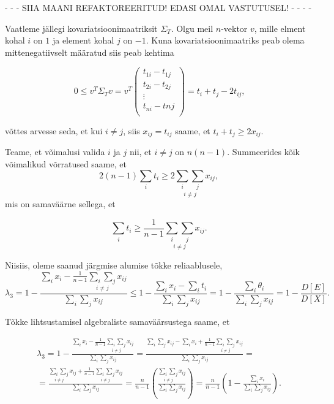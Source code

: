 \documentclass[a4paper,12pt]{article}
\numberwithin{equation}{section}
\theoremstyle{definition}
\begin{document}
 {\color{red}- - - SIIA MAANI REFAKTOREERITUD! EDASI OMAL VASTUTUSEL! - - - -} 

Vaatleme jällegi kovariatsioonimaatriksit $\Sigma_T$. Olgu meil $n$-vektor $v$, mille elment kohal $i$ on $1$ ja element kohal $j$ on $-1$. Kuna kovariatsioonimaatriks peab olema mittenegatiivselt määratud siis peab kehtima

\begin{equation*}
\label{eq:psd 1 -1 vector}
0 \leq v^T \Sigma_T v = v^T 
\begin{pmatrix}
t_{1i} - t_{1j} \\
t_{2i} - t_{2j} \\
\vdots \\
t_{ni} - t{nj} \\
\end{pmatrix}
= t_{i} + t_{j} - 2 t_{ij} \text{,}
\end{equation*}

võttes arvesse seda, et kui $i \neq j$, siis $x_{ij} = t_{ij}$ saame, et $t_i + t_j \geq 2 x_{ij}$. 

Teame, et võimalusi valida $i$ ja $j$ nii, et $i \neq j$ on $n \left( n -1 \right)$. Summeerides kõik võimalikud võrratused saame, et
\begin{equation*}
2 \left( n - 1 \right) \sum_i t_i \geq 2  \underset{i \neq j}{\sum_i \sum_j} x_{ij},
\end{equation*}
mis on samaväärne sellega, et

\begin{equation*}
\sum_i t_i \geq  \frac{1}{n - 1} \underset{i \neq j}{\sum_i \sum_j} x_{ij}.
\end{equation*}


Niisiis, oleme saanud järgmise alumise tõkke reliaablusele, 
\begin{equation*}
\lambda_3 = 1 - \frac{\sum_i x_i - \frac{1}{n-1}{\underset{i \neq j}{\sum_i \sum_j} x_{ij}}}{\sum_i \sum_j x_{ij}} \leq  1 - \frac{\sum_i x_i - \sum_i t_i}{\sum_i \sum_j x_{ij}} =   1 - \frac{\sum_i \theta_i}{\sum_i \sum_j x_{ij}} =  1 - \frac{D \left[ E \right]}{D \left[ X \right]} \text{.}
\end{equation*}

Tõkke lihtsustamisel algebraliste samaväärsustega saame, et

\begin{equation*}
\begin{gathered}
\lambda_3 = 1 - \frac{\sum_i x_i - \frac{1}{n-1}{\underset{i \neq j}{\sum_i \sum_j} x_{ij}}}{\sum_i \sum_j x_{ij}} =  \frac{\sum_i \sum_j x_{ij} -  \sum_i x_i + \frac{1}{n-1}{\underset{i \neq j}{\sum_i \sum_j} x_{ij}}  }{\sum_i \sum_j x_{ij}} = \\
= \frac{{\underset{i \neq j}{\sum_i \sum_j} x_{ij}} + \frac{1}{n-1}{\underset{i \neq j}{\sum_i \sum_j} x_{ij}}}{\sum_i \sum_j x_{ij}} = \frac{n}{n-1} \left( \frac{\underset{i \neq j}{\sum_i \sum_j} x_{ij}}{\sum_i \sum_j x_{ij}} \right) = \frac{n}{n-1} \left(1 - \frac{\sum_i x_{i}}{\sum_i \sum_j x_{ij}} \right).
\end{gathered}
\end{equation*}
\end{document}
